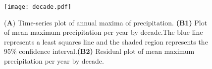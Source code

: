 \documentclass[12pt, a4paper]{article}
\begin{document}
  
  
  \begin{figure}[H]
    \begin{center}
      \texttt{[image: decade.pdf]}
    \end{center}
    \caption{(\textbf{A}) Time-series plot of annual maxima of precipitation.
    \textbf{(B1)} Plot of mean maximum precipitation per year by decade.\@ The
    blue line represents a least squares line and the shaded region represents
    the 95\% confidence interval.\@ \textbf{(B2)} Residual plot of mean maximum
    precipitation per year by decade.}
    \label{fig:timeseries_precip}
  \end{figure}
  
\end{document}
